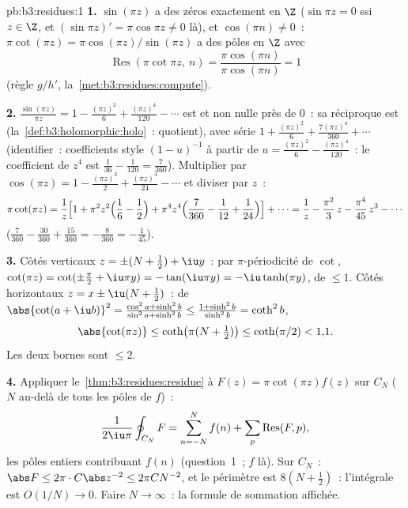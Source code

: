 \begin{solution}{pb:b3:residues:1}
\textbf{1.} $\sin(\pi z)$ a des zéros  exactement en
$\Z$ ($\sin\pi z = 0$ ssi $z \in \Z$, et $(\sin\pi z)' =
\pi\cos\pi z \neq 0$ là), et $\cos(\pi n) \neq 0$~:
$\pi\cot(\pi z) = \pi\cos(\pi z)/\sin(\pi z)$ a des pôles
 en $\Z$ avec
\[
\operatorname{Res}(\pi\cot\pi z,\ n)
= \frac{\pi\cos(\pi n)}{\pi\cos(\pi n)} = 1
\]
(règle $g/h'$, la~\cref{met:b3:residues:compute}).

\textbf{2.} $\frac{\sin(\pi z)}{\pi z} = 1 - \frac{(\pi
z)^2}6 + \frac{(\pi z)^4}{120} - \cdots$ est  et
non nulle près de $0$~: sa réciproque est 
(la~\cref{def:b3:holomorphic:holo}~: quotient), avec série
$1 + \frac{(\pi z)^2}{6} + \frac{7(\pi z)^4}{360} +
\cdots$ (identifier~: coefficients style $(1 - u)^{-1}$ à
partir de $u = \frac{(\pi z)^2}6 - \frac{(\pi z)^4}{120}$~:
le coefficient de $z^4$ est $\frac1{36} - \frac1{120} =
\frac{7}{360}$). Multiplier par $\cos(\pi z) = 1 -
\frac{(\pi z)^2}2 + \frac{(\pi z)^4}{24} - \cdots$ et
diviser par $z$~:
\[
\pi\cot(\pi z) = \frac1z\Bigl[1 + \pi^2z^2\Bigl(\frac16 -
\frac12\Bigr) + \pi^4z^4\Bigl(\frac7{360} - \frac1{12} +
\frac1{24}\Bigr)\Bigr] + \cdots
= \frac1z - \frac{\pi^2}3\,z - \frac{\pi^4}{45}\,z^3 -
\cdots
\]
($\frac7{360} - \frac{30}{360} + \frac{15}{360} =
-\frac8{360} = -\frac1{45}$).

\textbf{3.} Côtés verticaux $z = \pm(N + \frac12) + \iu
y$~: par $\pi$-périodicité de $\cot$, $\cot(\pi z) =
\cot(\pm\frac\pi2 + \iu\pi y) = -\tan(\iu\pi y) =
-\iu\tanh(\pi y)$, de  $\leq 1$. Côtés horizontaux $z
= x \pm \iu(N + \frac12)$~: de $\abs{\cot(a + \iu b)}^2 =
\frac{\cos^2a + \sinh^2b}{\sin^2a + \sinh^2b} \leq \frac{1
+ \sinh^2b}{\sinh^2b} = \coth^2 b$,
\[
\abs{\cot(\pi z)} \leq \coth\bigl(\pi(N + \tfrac12)\bigr)
\leq \coth(\pi/2) < 1{,}1 .
\]
Les deux bornes sont $\leq 2$.

\textbf{4.} Appliquer le~\cref{thm:b3:residues:residue} à
$F(z) = \pi\cot(\pi z)f(z)$ sur $C_N$ ($N$ au-delà de tous
les pôles de $f$)~:
\[
\frac1{2\iu\pi}\oint_{C_N}F = \sum_{n=-N}^{N}f(n) +
\sum_p\operatorname{Res}(F, p),
\]
les pôles entiers contribuant $f(n)$ (question~1~; $f$
 là). Sur $C_N$~: $\abs F \leq 2\pi\cdot
C\abs z^{-2} \leq 2\pi C N^{-2}$, et le périmètre est $8(N +
\frac12)$~: l'intégrale est $O(1/N) \to 0$. Faire $N \to
\infty$~: la formule de sommation affichée.


\end{solution}
